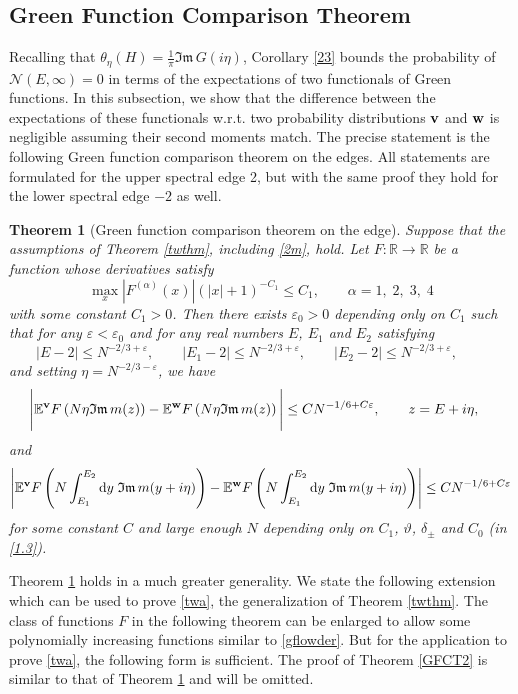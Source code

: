\documentclass[draft]{article}
\newcommand{\ttau}{\vartheta}
\newcommand{\e}{\varepsilon}
\newcommand{\eps}{\varepsilon}
\newcommand{\rd}{{\rm d}}
\newcommand{\bv}{{\bf{v}}}
\newcommand{\bw}{{\bf{w}}}
\newcommand{\al}{\alpha}
\newcommand{\be}{\begin{equation}}
\newcommand{\ee}{\end{equation}}
\newcommand{\cN}{{\mathcal N}}
\newcommand{\im}{{\mathfrak{Im} \, }}
\newcommand{\E}{{\mathbb E }}
\newcommand{\R}{{\mathbb R }}
\newtheorem{theorem}{Theorem}
\numberwithin{equation}{section}
\numberwithin{theorem}{section}
\numberwithin{definition}{section}
\numberwithin{remark}{section}
\begin{document}
\subsection{Green Function Comparison Theorem}\label{sec:green}

Recalling that $\theta_\eta(H)= \frac{1}{\pi}\im G(i\eta)$,
Corollary  \ref{23}  bounds the probability of $\cN(E,\infty)=0$ in terms of  the expectations
 of two functionals of Green functions. In this subsection, we show that the difference 
between the expectations of these  functionals
w.r.t. two probability distributions 
$\bv$ and $\bw$ is  negligible assuming their second moments
match. The precise statement is the following Green function
 comparison theorem on the edges. All statements are formulated
for the upper spectral edge 2, but with the same proof they hold for the lower
spectral edge $-2$ as well. 


\begin{theorem} [Green function comparison theorem on the edge] \label{GFCT}
Suppose that  the assumptions of Theorem  \ref{twthm}, including \eqref{2m},  hold.
Let    $F:\R\to \R$ be a function whose derivatives satisfy  
\be\label{gflowder}
\max_{x}|F^{(\al)}(x)|\left(|x|+1\right)^{-C_1} \leq C_1,\qquad \al=1,\;2,\;3,\;4
\ee
with some constant $C_1>0$.
Then there exists $\e_0>0$ depending only on $C_1$ such that for any $\e<\e_0$
and for any real numbers $E$, $E_1$ and $E_2$ satisfying
$$
   |E-2|\leq N^{-2/3+\eps}, \qquad |E_1-2|\leq N^{-2/3+\eps}, \qquad 
 |E_2-2|\leq N^{-2/3+\eps}, \qquad
$$
and setting $\eta = N^{-2/3-\e}$,
we have
\begin{align}\label{maincomp}
\Bigg|\E^\bv  F  
\left (   
N \eta \im m (z)    \right )  &  -
\E^\bw  F  
\left (  N \eta \im m (z)      \right )  \Bigg|
\le  C N^{-1/6+C \e},\qquad z=E+i\eta,
\end{align}
and 
\be\label{c1}
\left|\E^\bv  F\left(N \int_{E_1}^{E_2} \rd y \;  \im m (y +i\eta)\right)-\E^\bw 
 F \left(N \int_{E_1}^{E_2}  \rd y \; \im m (y+i\eta ) \right)\right|\leq C N^{-1/6+C \e}
\ee 
for some constant $C$ and large enough $N$ depending only on  $C_1$,
  $\ttau$, $\delta_\pm$ and $C_0$ (in \eqref{1.3}).


\end{theorem}




\bigskip 

Theorem \ref{GFCT} holds in a much greater generality. We state the following extension 
which can be used to prove \eqref{twa}, the generalization  of Theorem \ref{twthm}. 
The class of functions $F$ in the following 
theorem can be enlarged  to allow some polynomially increasing functions
 similar to \eqref{gflowder}. 
But for the application to prove  \eqref{twa}, the following form is sufficient.
The proof of Theorem \ref{GFCT2} is similar to that of Theorem \ref{GFCT} and will be omitted. 
\end{document}
